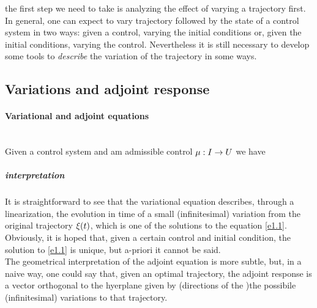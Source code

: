 the first step we need to take is analyzing the effect of varying a trajectory first. In general, one can expect to vary trajectory followed by the state of a control system in two ways: given a control, varying the initial conditions or, given the initial conditions, varying the control. Nevertheless it is still necessary to develop some tools to \textit{describe} the variation of the trajectory in some ways. 

\subsection{Variations and adjoint response}
\paragraph{Variational and adjoint equations}\mbox{}\\
Given a control system \controlSystem and am admissible control $\mu:I\rightarrow U$ we have

\subparagraph{interpretation} It is straightforward to see that the variational equation describes, through a linearization,  the evolution in time of a small (infinitesimal) variation from the original trajectory $\xi (t)$, which is one of the solutions to the equation \ref{e1.1}.\\
Obviously, it is hoped that, given a certain control and initial condition, the solution to \ref{e1.1} is unique, but a-priori it cannot be said.\\
The geometrical interpretation of the adjoint equation is more subtle, but, in a naive way, one could say that, given an optimal trajectory, the adjoint response is a vector orthogonal to the hyerplane given by (directions of the )the possibile (infinitesimal) variations to that trajectory. 

